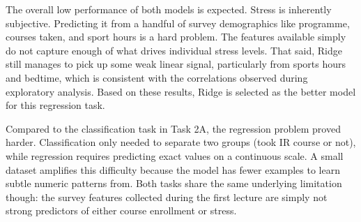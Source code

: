 The overall low performance of both models is expected. Stress is inherently subjective. Predicting it from a handful of survey demographics like programme, courses taken, and sport hours is a hard problem. The features available simply do not capture enough of what drives individual stress levels. That said, Ridge still manages to pick up some weak linear signal, particularly from sports hours and bedtime, which is consistent with the correlations observed during exploratory analysis. Based on these results, Ridge is selected as the better model for this regression task.

Compared to the classification task in Task 2A, the regression problem proved harder. Classification only needed to separate two groups (took IR course or not), while regression requires predicting exact values on a continuous scale. A small dataset amplifies this difficulty because the model has fewer examples to learn subtle numeric patterns from. Both tasks share the same underlying limitation though: the survey features collected during the first lecture are simply not strong predictors of either course enrollment or stress.
